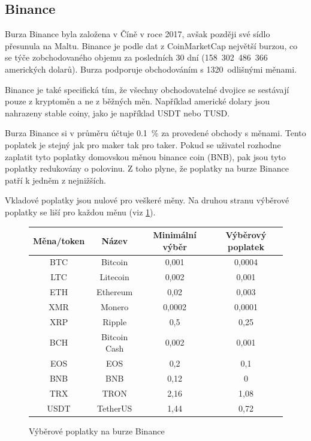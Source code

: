 \documentclass[thesis=B,czech]{FITthesis}[2019/03/21]
\begin{document}
\subsection{Binance}
Burza Binance byla založena v Číně v roce 2017, avšak později své sídlo přesunula na Maltu. Binance je podle dat z CoinMarketCap největší burzou, co se týče zobchodovaného objemu za posledních 30 dní (158~302~486~366 amerických dolarů). \cite{coinmarketcap} Burza podporuje obchodováním s 1320~odlišnými měnami.

Binance je také specifická tím, že všechny obchodovatelné dvojice se sestávají pouze z kryptoměn a ne z běžných měn. Například americké dolary jsou nahrazeny stable coiny, jako je například USDT nebo TUSD. 

Burza Binance si v průměru účtuje 0.1~\% za provedené obchody s měnami. Tento poplatek je stejný jak pro maker tak pro taker. Pokud se uživatel rozhodne zaplatit tyto poplatky domovskou měnou binance coin (BNB), pak jsou tyto poplatky redukovány o polovinu. Z toho plyne, že poplatky na burze Binance patří k jedněm z nejnižších.

Vkladové poplatky jsou nulové pro veškeré měny. Na druhou stranu výběrové poplatky se liší pro každou měnu (viz \ref{binance_fees}). \cite{blockonomi_binance}

\begin{figure}\centering
    \begin{center}
     \begin{tabular}{||c | c | c | c||} 
     \hline
     Měna/token & Název & Minimální výběr & Výběrový poplatek \\ [0.5ex] 
     \hline\hline
     BTC & Bitcoin & 0,001 & 0,0004 \\ 
     \hline
     LTC & Litecoin & 0,002 & 0,001 \\
     \hline
     ETH & Ethereum & 0,02 & 0,003 \\
     \hline
     XMR & Monero & 0,0002 & 0,0001 \\
     \hline
     XRP & Ripple & 0,5 & 0,25 \\
     \hline
     BCH & Bitcoin Cash & 0,002 & 0,001 \\
     \hline
     EOS & EOS & 0,2 & 0,1 \\
     \hline
     BNB & BNB & 0,12 & 0 \\
     \hline
     TRX & TRON & 2,16 & 1,08 \\
     \hline
     USDT & TetherUS & 1,44 & 0,72 \\ [1ex] 
     \hline
    \end{tabular}
    \end{center}
    \caption{Výběrové poplatky na burze Binance \cite{binance_fees}}
    \label{binance_fees}
\end{figure}
\end{document}
